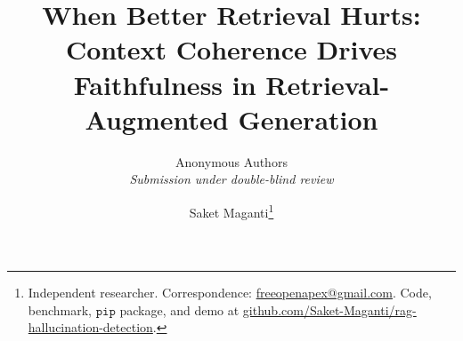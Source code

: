 \documentclass[10pt]{article}                  %
\title{\Large\bfseries When Better Retrieval Hurts:\\[0.2em]
Context Coherence Drives Faithfulness in Retrieval-Augmented Generation}
\author{Anonymous Authors\\\textit{Submission under double-blind review}}
\author{%
    Saket Maganti\thanks{%
      Independent researcher.  Correspondence:
      \href{mailto:freeopenapex@gmail.com}{freeopenapex@gmail.com}.
      Code, benchmark, $\texttt{pip}$ package, and demo at
      \href{https://github.com/Saket-Maganti/rag-hallucination-detection}{github.com/Saket-Maganti/rag-hallucination-detection}.
    }
  }
\date{}
\theoremstyle{plain}
\theoremstyle{definition}
\begin{document}
\maketitle

\begin{abstract}

\end{abstract}











{\footnotesize


}

\end{document}
